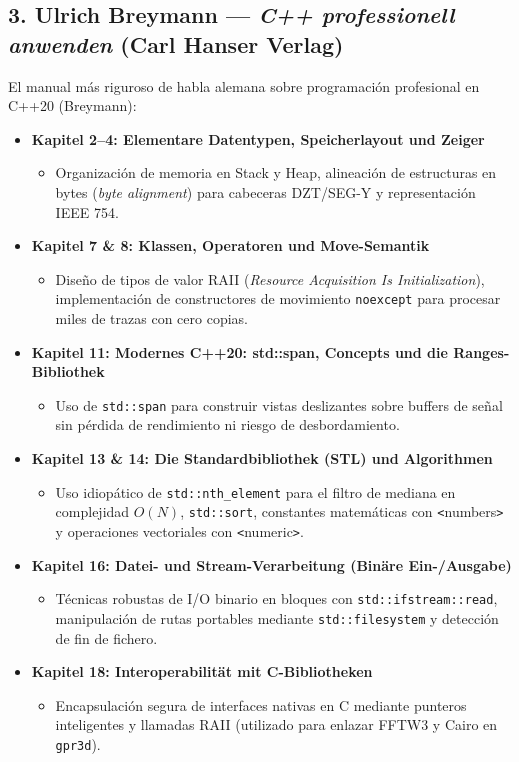 \documentclass[11pt,a4paper]{article}
\begin{document}
\subsection{3. Ulrich Breymann --- \textit{C++ professionell anwenden} (Carl Hanser Verlag)}
El manual m{\'a}s riguroso de habla alemana sobre programaci{\'o}n profesional en C++20 (Breymann):
\begin{itemize}
    \item \textbf{Kapitel 2--4: Elementare Datentypen, Speicherlayout und Zeiger}
    \begin{itemize}
        \item Organizaci{\'o}n de memoria en Stack y Heap, alineaci{\'o}n de estructuras en bytes (\textit{byte alignment}) para cabeceras DZT/SEG-Y y representaci{\'o}n IEEE 754.
    \end{itemize}
    \item \textbf{Kapitel 7 \& 8: Klassen, Operatoren und Move-Semantik}
    \begin{itemize}
        \item Dise{\~n}o de tipos de valor RAII (\textit{Resource Acquisition Is Initialization}), implementaci{\'o}n de constructores de movimiento \texttt{noexcept} para procesar miles de trazas con cero copias.
    \end{itemize}
    \item \textbf{Kapitel 11: Modernes C++20: std::span, Concepts und die Ranges-Bibliothek}
    \begin{itemize}
        \item Uso de \texttt{std::span} para construir vistas deslizantes sobre buffers de se{\~n}al sin p{\'e}rdida de rendimiento ni riesgo de desbordamiento.
    \end{itemize}
    \item \textbf{Kapitel 13 \& 14: Die Standardbibliothek (STL) und Algorithmen}
    \begin{itemize}
        \item Uso idiop{\'a}tico de \texttt{std::nth\_element} para el filtro de mediana en complejidad $O(N)$, \texttt{std::sort}, constantes matem{\'a}ticas con \texttt{<}numbers\texttt{>} y operaciones vectoriales con \texttt{<}numeric\texttt{>}.
    \end{itemize}
    \item \textbf{Kapitel 16: Datei- und Stream-Verarbeitung (Bin{\"a}re Ein-/Ausgabe)}
    \begin{itemize}
        \item T{\'e}cnicas robustas de I/O binario en bloques con \texttt{std::ifstream::read}, manipulaci{\'o}n de rutas portables mediante \texttt{std::filesystem} y detecci{\'o}n de fin de fichero.
    \end{itemize}
    \item \textbf{Kapitel 18: Interoperabilit{\"a}t mit C-Bibliotheken}
    \begin{itemize}
        \item Encapsulaci{\'o}n segura de interfaces nativas en C mediante punteros inteligentes y llamadas RAII (utilizado para enlazar FFTW3 y Cairo en \texttt{gpr3d}).
    \end{itemize}
\end{itemize}
\end{document}
